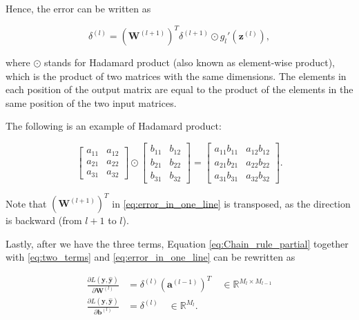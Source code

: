 \documentclass[
	parskip, 			   %
	twoside, 			   %
	DIV=14, 			   %
	BCOR=15.0mm, 		   %
	headsepline, 		   %
	open=right, 		   %
	captions=tableheading, %
	bibliography=totoc,    %
	numbers=noenddot       %
]{scrreprt}
\begin{document}
Hence, the error can be written as

\begin{equation}
    \label{eq:error_in_one_line}
        \delta^{(l)} = (\mathbf{W}^{(l+1)})^T \delta^{(l+1)} \odot g_{l}'(\mathbf{z}^{(l)}),
\end{equation}

where $\odot$ stands for Hadamard product (also known as element-wise product), which is the product of two matrices with the same dimensions. The elements in each position of the output matrix are equal to the product of the elements in the same position of the two input matrices. 

The following is an example of Hadamard product:

\begin{equation}
    \label{eq:Hadamard_product}
\left[\begin{array}{ll}
a_{11} & a_{12}  \\
a_{21} & a_{22} \\
a_{31} & a_{32} 
\end{array}\right] \odot \left[\begin{array}{ll}
b_{11} & b_{12}  \\
b_{21} & b_{22}\\
b_{31} & b_{32} 
\end{array}\right]=\left[\begin{array}{ll}
a_{11} b_{11} & a_{12} b_{12} \\
a_{21} b_{21} & a_{22} b_{22}  \\
a_{31} b_{31} & a_{32} b_{32} 
\end{array}\right].
\end{equation}

Note that $(\mathbf{W}^{(l+1)})^T$ in \ref{eq:error_in_one_line} is transposed, as the direction is backward (from $l+1$ to $l$).

Lastly, after we have the three terms, Equation \ref{eq:Chain_rule_partial} together with \ref{eq:two_terms} and \ref{eq:error_in_one_line} can be rewritten as

\begin{equation}
    \label{eq:Chain_rule_partial_deducted}
    \begin{aligned}
        \frac{\partial L\left( \mathbf{y}, \hat{\mathbf{y}} \right)}{\partial \mathbf{W}^{(l)}} &= \delta^{(l)} (\mathbf{a}^{(l-1)})^T \quad \in \mathbb{R}^{M_{l} \times M_{l-1}}
        \\
        \frac{\partial L\left( \mathbf{y}, \hat{\mathbf{y}} \right)}{\partial \mathbf{b}^{(l)}} &= \delta^{(l)} \quad \in \mathbb{R}^{M_{l}}.
    \end{aligned}
\end{equation}
\end{document}
